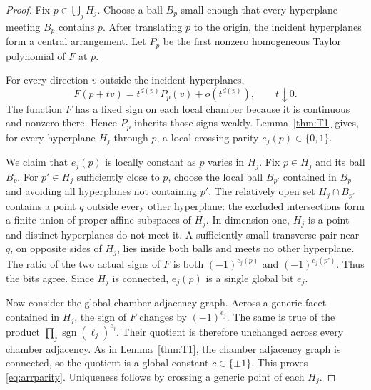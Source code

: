 \documentclass[11pt]{article}
\theoremstyle{definition}
\theoremstyle{remark}
\newcommand{\bits}{\{0,1\}}
\newcommand{\sign}{\operatorname{sgn}}
\begin{document}
\begin{proof}
Fix $p\in\bigcup_jH_j$. Choose a ball $B_p$ small enough that every hyperplane meeting $B_p$ contains $p$. After translating $p$ to the origin, the incident hyperplanes form a central arrangement. Let $P_p$ be the first nonzero homogeneous Taylor polynomial of $F$ at $p$.

For every direction $v$ outside the incident hyperplanes,
\[
 F(p+tv)=t^{d(p)}P_p(v)+o(t^{d(p)}),
 \qquad t\downarrow0.
\]
The function $F$ has a fixed sign on each local chamber because it is continuous and nonzero there. Hence $P_p$ inherits those signs weakly. Lemma~\ref{thm:T1} gives, for every hyperplane $H_j$ through $p$, a local crossing parity $e_j(p)\in\bits$.

We claim that $e_j(p)$ is locally constant as $p$ varies in $H_j$. Fix $p\in H_j$ and its ball $B_p$. For $p'\in H_j$ sufficiently close to $p$, choose the local ball $B_{p'}$ contained in $B_p$ and avoiding all hyperplanes not containing $p'$. The relatively open set $H_j\cap B_{p'}$ contains a point $q$ outside every other hyperplane: the excluded intersections form a finite union of proper affine subspaces of $H_j$. In dimension one, $H_j$ is a point and distinct hyperplanes do not meet it. A sufficiently small transverse pair near $q$, on opposite sides of $H_j$, lies inside both balls and meets no other hyperplane. The ratio of the two actual signs of $F$ is both $(-1)^{e_j(p)}$ and $(-1)^{e_j(p')}$. Thus the bits agree. Since $H_j$ is connected, $e_j(p)$ is a single global bit $e_j$.

Now consider the global chamber adjacency graph. Across a generic facet contained in $H_j$, the sign of $F$ changes by $(-1)^{e_j}$. The same is true of the product $\prod_j\sign(\ell_j)^{e_j}$. Their quotient is therefore unchanged across every chamber adjacency. As in Lemma~\ref{thm:T1}, the chamber adjacency graph is connected, so the quotient is a global constant $c\in\{\pm1\}$. This proves \eqref{eq:arrparity}. Uniqueness follows by crossing a generic point of each $H_j$.
\end{proof}
\end{document}

